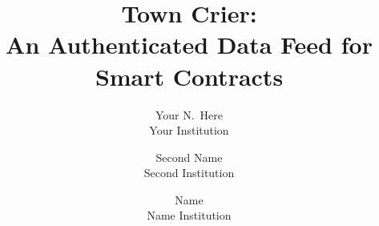 \documentclass[letterpaper,twocolumn,10pt]{article}
\date{}
\title{\Large \bf Town Crier: \\ An Authenticated Data Feed for Smart Contracts}
\author{
{\rm Your N.\ Here}\\
Your Institution
\and
{\rm Second Name}\\
Second Institution
\and
{\rm Name}\\
Name Institution
} %
\begin{document}
\maketitle


	














\pagebreak




{\footnotesize
  
  
}

\end{document}
